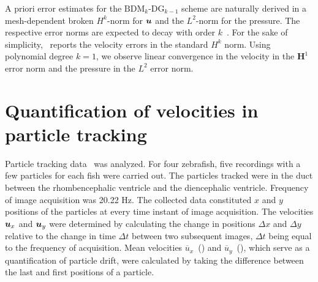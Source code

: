 \documentclass{WileyMSP-template}
\begin{document}
A priori error estimates for the $\mathrm{BDM}_k$-$\mathrm{DG}_{k-1}$ scheme are naturally 
derived in a mesh-dependent broken $H^k$-norm for $\bm{u}$ and the $L^2$-norm for the pressure.
The respective error norms are expected to decay with order $k$~\cite{Cockburn2005AEquations}.
For the sake of simplicity,~
reports the velocity errors in the standard $H^k$ norm. Using polynomial degree  
$k=1$, we observe linear convergence in the velocity in the $\mathbf{H}^1$ error norm
and the pressure in the $L^2$ error norm.   

\section{Quantification of velocities in particle tracking}\label{sec:appC_particle_transport}
Particle tracking data~\cite{Olstad2019CiliaryDevelopment} was analyzed.
For four zebrafish, five recordings with a few particles for each fish were carried out.
The particles tracked were in the duct between the rhombencephalic ventricle and the
diencephalic ventricle. Frequency of image acquisition was 20.22 Hz.
The collected data constituted $x$ and $y$ positions of the particles at every time
instant of image acquisition. The velocities $\bm{u}_x$ and $\bm{u}_y$ were determined by
calculating the change in positions $\Delta x$ and $\Delta y$ relative to the change
in time $\Delta t$ between two subsequent images, $\Delta t$ being equal to the
frequency of acquisition.
Mean velocities $\overline{u}_x$~() and
$\overline{u}_y$~(),
which serve as a quantification of particle drift, were calculated
by taking the difference between the last and first positions of a particle.
\end{document}
